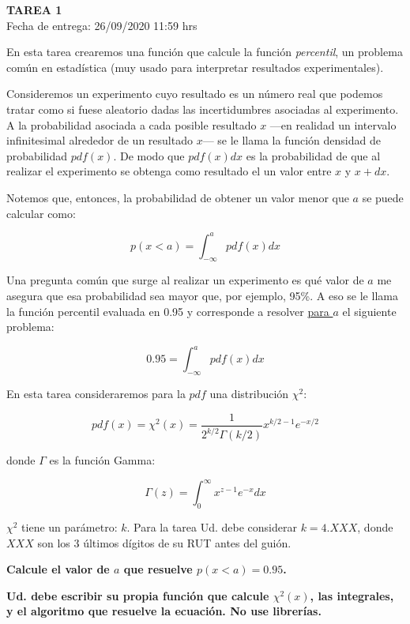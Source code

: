\documentclass[letter, 11pt]{article}
\newcommand{\tareanro}{1}
\newcommand{\fechaentrega}{26/09/2020 11:59 hrs}
\begin{document}
\thispagestyle{firstpage}

\begin{center}
  {\uppercase{\LARGE \bf Tarea \tareanro}}\\
  Fecha de entrega: \fechaentrega
\end{center}



En esta tarea crearemos una función que calcule la función {\it percentil},
un problema común en estadística (muy usado para interpretar resultados
experimentales).

Consideremos un experimento cuyo resultado es un número real que podemos tratar
como si fuese aleatorio dadas las incertidumbres asociadas al experimento. A la
probabilidad asociada a cada posible resultado $x$ ---en realidad un intervalo
infinitesimal alrededor de un resultado $x$--- se le llama la función densidad
de probabilidad $pdf(x)$. De modo que $pdf(x) dx$ es la probabilidad de que al
realizar el experimento se obtenga como resultado el un valor entre $x$ y
$x+dx$.

Notemos que, entonces, la probabilidad de obtener un valor menor que $a$ se
puede calcular como:

$$p(x<a) = \int_{-\infty}^{a} pdf(x) dx $$

Una pregunta común que surge al realizar un experimento es qué valor de $a$ me
asegura que esa probabilidad sea mayor que, por ejemplo, 95\%. A eso se le
llama la función percentil evaluada en 0.95 y corresponde a resolver
\underline{para $a$} el siguiente problema:

$$ 0.95 = \int_{-\infty}^{a} pdf(x) dx $$

En esta tarea consideraremos para la $pdf$ una distribución $\chi^2$:

$$ pdf(x) = \chi^2(x) = \frac{1}{2^{k/2}\Gamma(k/2)} x^{k/2-1} e^{-x/2} $$

donde $\Gamma$ es la función Gamma:

$$ \Gamma(z) = \int_0^{\infty} x^{z-1}e^{-x}dx $$

$\chi^2$ tiene un parámetro: $k$. Para la tarea Ud. debe considerar $k=4.XXX$,
donde $XXX$ son los 3 últimos dígitos de su RUT antes del guión.

{\bf Calcule el valor de $a$ que resuelve $p(x<a) = 0.95$.}

{\bf Ud. debe escribir su propia función que calcule $\chi^2(x)$, las integrales, y
el algoritmo que resuelve la ecuación. No use librerías.}
\end{document}
